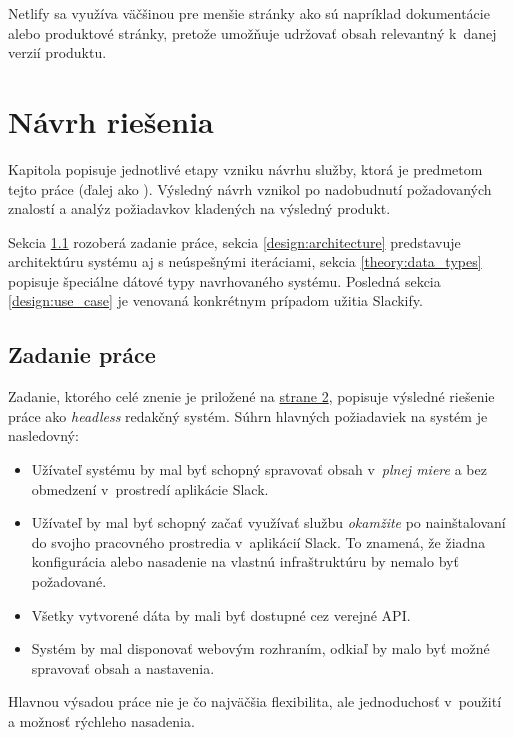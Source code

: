 \noindent Netlify sa využíva väčšinou pre menšie stránky ako sú napríklad dokumentácie alebo produktové stránky, pretože umožňuje udržovať obsah relevantný k~danej verzií produktu.

\chapter{Návrh riešenia}
Kapitola popisuje jednotlivé etapy vzniku návrhu služby, ktorá je predmetom tejto práce (ďalej ako ). Výsledný návrh vznikol po nadobudnutí požadovaných znalostí a analýz požiadavkov kladených na výsledný produkt.

Sekcia \ref{design:assignment} rozoberá zadanie práce, sekcia \ref{design:architecture} predstavuje architektúru systému aj s neúspešnými iteráciami, sekcia \ref{theory:data_types} popisuje špeciálne dátové typy navrhovaného systému. Posledná sekcia \ref{design:use_case} je venovaná konkrétnym prípadom užitia Slackify.

\section{Zadanie práce}
\label{design:assignment}
Zadanie, ktorého celé znenie je priložené na \hyperlink{page.2}{strane 2}, popisuje výsledné riešenie práce ako \emph{headless} redakčný systém. Súhrn hlavných požiadaviek na systém je nasledovný:

\begin{itemize}
	\item Užívateľ systému by mal byť schopný spravovať obsah v~\emph{plnej miere} a bez obmedzení v~prostredí aplikácie Slack.
	\item Užívateľ by mal byť schopný začať využívať službu \emph{okamžite} po nainštalovaní do svojho pracovného prostredia v~aplikácií Slack. To znamená, že žiadna konfigurácia alebo nasadenie na vlastnú infraštruktúru by nemalo byť požadované.
	\item Všetky vytvorené dáta by mali byť dostupné cez verejné API.
	\item Systém by mal disponovať webovým rozhraním, odkiaľ by malo byť možné spravovať obsah a nastavenia.
\end{itemize}

\noindent Hlavnou výsadou práce nie je čo najväčšia flexibilita, ale jednoduchosť v~použití a možnosť rýchleho nasadenia. 

